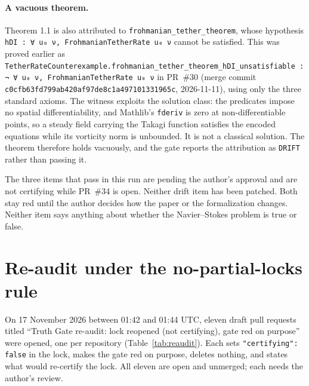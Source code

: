 \documentclass[11pt,a4paper]{article}
\newcommand{\code}[1]{\texttt{#1}}
\begin{document}
\paragraph{A vacuous theorem.} Theorem 1.1 is also attributed to
\code{frohmanian\_tether\_theorem}, whose hypothesis
\code{hDI : ∀ u₀ ν, FrohmanianTetherRate u₀ ν} cannot be satisfied. This was proved earlier as
\code{TetherRateCounterexample.frohmanian\_tether\_theorem\_hDI\_unsatisfiable :
¬ ∀ u₀ ν, FrohmanianTetherRate u₀ ν} in PR~\#30 (merge commit
\code{c0cfb63fd799ab420af97de8c1a497101331965c}, 2026-11-11), using only the three standard
axioms. The witness exploits the solution class: the predicates impose no spatial
differentiability, and Mathlib's \code{fderiv} is zero at non-differentiable points, so a
steady field carrying the Takagi function satisfies the encoded equations while its vorticity
norm is unbounded. It is not a classical solution. The theorem therefore holds vacuously, and
the gate reports the attribution as \code{DRIFT} rather than passing it.

The three items that pass in this run are pending the author's approval and are not certifying
while PR~\#34 is open. Neither drift item has been patched. Both stay red until the author decides how the paper or the
formalization changes. Neither item says anything about whether the Navier--Stokes problem is
true or false.

\section{Re-audit under the no-partial-locks rule}
\label{sec:reaudit}

On 17 November 2026 between 01:42 and 01:44 UTC, eleven draft pull requests titled ``Truth Gate
re-audit: lock reopened (not certifying), gate red on purpose'' were opened, one per repository
(Table~\ref{tab:reaudit}). Each sets \code{"certifying": false} in the lock, makes the gate red on
purpose, deletes nothing, and states what would re-certify the lock. All eleven are open and
unmerged; each needs the author's review.
\end{document}
